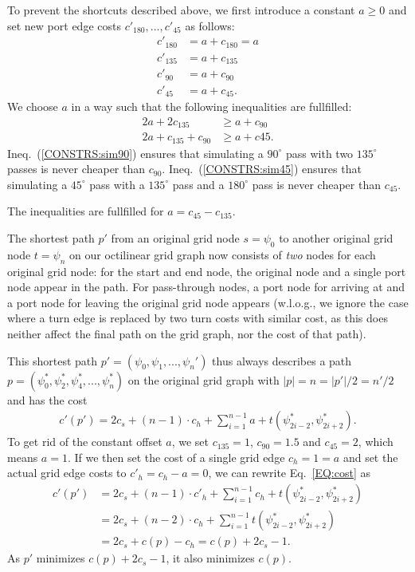 \documentclass{sig-alternate-sigmod09}
\begin{document}
To prevent the shortcuts described above, we first introduce a constant $a \geq 0$ and set new port edge costs $c'_{180}, ..., c'_{45}$ as follows:
%
\begin{align}
	c'_{180} &= a + c_{180} = a \\
	c'_{135} &= a + c_{135} \\
	c'_{90} &= a + c_{90} \\
	c'_{45} &= a + c_{45}.
\end{align}
%
We choose $a$ in a way such that the following inequalities are fullfilled:
%
\begin{align}
	2a + 2c_{135} &\geq a + c_{90} \label{CONSTRS:sim90}\\
	2a + c_{135} + c_{90} &\geq a + c{45}\label{CONSTRS:sim45}.
\end{align}
Ineq.~(\ref{CONSTRS:sim90}) ensures that simulating a $90^{\circ}$ pass with two $135^{\circ}$ passes is never cheaper than $c_{90}$.
Ineq.~(\ref{CONSTRS:sim45}) ensures that simulating a $45^{\circ}$ pass with a $135^{\circ}$ pass and a $180^{\circ}$ pass is never cheaper than $c_{45}$.

The inequalities are fullfilled for $a = c_{45} - c_{135}$.

The shortest path $p'$ from an original grid node $s = \psi_0$ to another original grid node $t=\psi_n$ on our octilinear grid graph now consists of \emph{two} nodes for each original grid node: for the start and end node, the original node and a single port node appear in the path.
For pass-through nodes, a port node for arriving at and a port node for leaving the original grid node appears (w.l.o.g., we ignore the case where a turn edge is replaced by two turn costs with similar cost, as this does neither affect the final path on the grid graph, nor the cost of that path).

This shortest path $p' = (\psi_0, \psi_1, ..., \psi_n')$ thus always describes a path $p = (\psi^*_0, \psi^*_2, \psi^*_4, ..., \psi^*_{n})$ on the original grid graph with $|p| = n = |p'| / 2 = n' / 2$ and has the cost
%
\begin{align}
	c'(p') = 2 c_s + \left(n - 1\right) \cdot c_h + \sum_{i=1}^{n - 1} a + t\left(\psi^*_{2i - 2}, \psi^*_{2i+2}\right)\label{EQ:cost}.
\end{align}
%
To get rid of the constant offset $a$, we set $c_{135} = 1$, $c_{90} = 1.5$ and $c_{45} = 2$, which means $a = 1$.
If we then set the cost of a single grid edge $c_h = 1 = a$ and set the actual grid edge costs to $c'_h = c_h - a = 0$, we can rewrite Eq.~\ref{EQ:cost} as  
%
\begin{align}
	c'(p') &= 2 c_s +  \left(n - 1\right) \cdot c'_h + \sum_{i=1}^{n - 1} c_h + t\left(\psi^*_{2i - 2}, \psi^*_{2i+2}\right) \\
	     &= 2 c_s + \left(n - 2\right) \cdot c_h + \sum_{i=1}^{n - 1} t \left(\psi^*_{2i - 2}, \psi^*_{2i+2}\right) \\
	     &= 2 c_s + c(p) - c_h = c(p) + 2 c_s - 1.
\end{align}
%
As $p'$ minimizes $c(p) + 2 c_s - 1$, it also minimizes $c(p)$.
\end{document}
